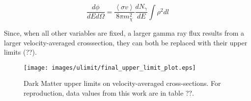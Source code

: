   \begin{equation}\label{eqn:ulim}
    \frac{d\phi}{dE d\Omega} = \frac{ \left \langle \sigma v \right \rangle }{8\pi m_{\chi}^{2}} \frac{dN_{\gamma}}{dE} \int \rho^{2} dl
  \end{equation}
  
  Since, when all other variables are fixed, a larger gamma ray flux results from a larger velocity-averaged crosssection, they can both be replaced with their upper limits (??).

  \begin{figure}[ht]
    \begin{center}
      \texttt{[image: images/ulimit/final\_upper\_limit\_plot.eps]}
      \caption[Dark Matter Upper Limit Plot]
      {
        Dark Matter upper limits on velocity-averaged cross-sections.
        For reproduction, data values from this work are in table ??.
      }
      \label{fig:ulim}
    \end{center}
  \end{figure}
  
  
